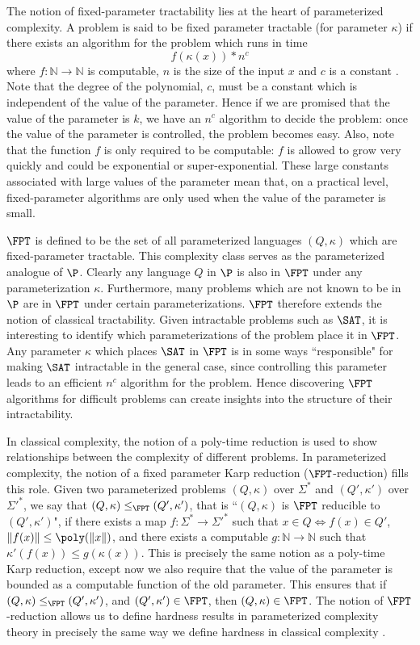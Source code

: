 \documentclass[11pt]{report}
\begin{document}
The notion of fixed-parameter tractability lies at the heart of parameterized complexity. A problem is said to be fixed parameter tractable (for parameter $\kappa$)  if there exists an algorithm for the problem which runs in time \[f(\kappa (x)) * n^{c}\] where  $ f  :\mathbb{N}  \rightarrow \mathbb{N} $ is computable, $n$ is the size of the input $x$ and $c$ is a constant \cite{FlumGrohe}. Note that the degree of the polynomial, $c$, must be a constant which is independent of the value of the parameter. Hence if we are promised that the value of the parameter is $k$, we have an $n^c$ algorithm to decide the problem: once the value of the parameter is controlled, the problem becomes easy.  Also, note that the function $f$ is only required to be computable: $f$ is allowed to grow very quickly and could be exponential or super-exponential. These large constants associated with large values of the parameter mean that, on a practical level, fixed-parameter algorithms are only used when the value of the parameter is small.

$\FPT$ is defined to be the set of all parameterized languages $(Q,\kappa)$ which are fixed-parameter tractable. This complexity class serves as the parameterized analogue of $\P$.  Clearly any language $Q$ in $\P$ is also in $\FPT$ under any parameterization $\kappa$. Furthermore, many problems which are not known to be in $\P$ are in $\FPT$ under certain parameterizations. $\FPT$ therefore extends the notion of classical tractability. Given intractable problems such as $\SAT$, it is interesting to identify which parameterizations of the problem place it in $\FPT$. Any parameter $\kappa$ which places $\SAT$ in $\FPT$ is in some ways ``responsible" for making $\SAT$ intractable in the general case, since controlling this parameter leads to an efficient $n^c$ algorithm for the problem. Hence discovering $\FPT$ algorithms for difficult problems can create insights into the structure of their intractability.

In classical complexity, the notion of a poly-time reduction is used to show relationships between the complexity of different problems. In parameterized complexity, the notion of a fixed parameter Karp reduction ($\FPT$-reduction) fills this role. Given two parameterized problems $(Q,\kappa)$  over $\Sigma^{*}$ and $(Q',\kappa')$  over $\Sigma'^{*}$, we say that $(Q,\kappa) \leq _{\FPT} (Q',\kappa')$, that is ``$(Q,\kappa)$ is $\FPT$ reducible to $(Q',\kappa')$", if there exists a map $f:\Sigma^{*}\rightarrow \Sigma'^{*}$ such that $x\in Q \Leftrightarrow f(x)\in Q'$, $\|f(x)\| \leq \poly(\|x\|)$, and there exists a computable $g:\mathbb{N}\rightarrow \mathbb{N}$ such that $\kappa'(f(x)) \leq g(\kappa(x))$. This is precisely the same notion as a poly-time Karp reduction, except now we also require that the value of the parameter is bounded as a computable function of the old parameter. This ensures that if $(Q,\kappa) \leq _{\FPT} (Q',\kappa')$, and $(Q',\kappa') \in \FPT$, then $(Q,\kappa) \in \FPT$. The notion of $\FPT$-reduction allows us to define hardness results in parameterized complexity theory in precisely the same way we define hardness in classical complexity \cite{FlumGrohe}.
\end{document}
